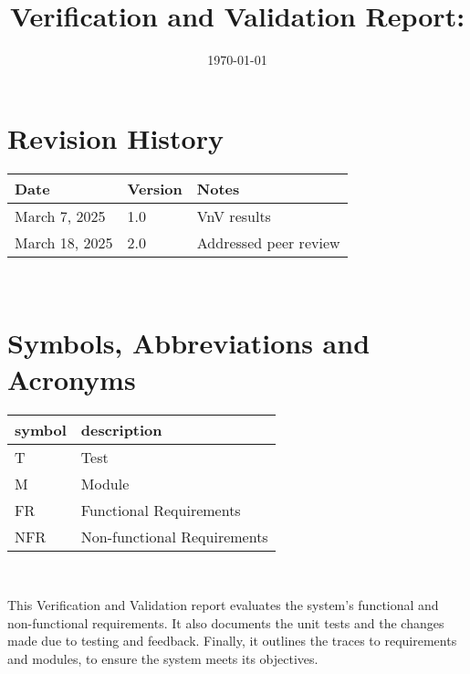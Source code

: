 \documentclass[12pt, titlepage]{article}
\begin{document}
\title{Verification and Validation Report: \progname} 
\author{\authname}
\date{\today}
	
\maketitle


\section{Revision History}

\begin{tabularx}{\textwidth}{p{3cm}p{2cm}X}
\toprule {\bf Date} & {\bf Version} & {\bf Notes}\\
\midrule
March 7, 2025 & 1.0 & VnV results\\
\midrule
March 18, 2025 & 2.0 & Addressed peer review\\
\bottomrule
\end{tabularx}

~\newpage

\section{Symbols, Abbreviations and Acronyms}

\renewcommand{\arraystretch}{1.2}
\begin{tabular}{l l} 
  \toprule		
  \textbf{symbol} & \textbf{description}\\
  \midrule 
  T & Test\\
  M & Module\\
  FR & Functional Requirements\\
  NFR & Non-functional Requirements\\
  \bottomrule
\end{tabular}\\

\newpage

\tableofcontents

\listoftables %

\listoffigures %

\newpage


This Verification and Validation report evaluates the system's functional and non-functional requirements. It also documents the unit tests and the changes made due to testing and feedback. Finally, it outlines the traces to requirements and modules, to ensure the system meets its objectives.
\end{document}
